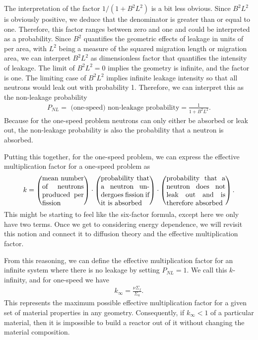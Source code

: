 The interpretation of the factor $1/(1 + B^2 L^2)$ is a bit less obvious. Since $B^2 L^2$ is obviously positive, we deduce that the denominator is greater than or equal to one. Therefore, this factor ranges between zero and one and could be interpreted as a probability. Since $B^2$ quantifies the geometric effects of leakage in units of per area, with $L^2$ being a measure of the squared migration length or migration area, we can interpret $B^2 L^2$ as dimensionless factor that quantifies the intensity of leakage. The limit of $B^2 L^2 = 0$ implies the geometry is infinite, and the factor is one. The limiting case of $B^2 L^2$ implies infinite leakage intensity so that all neutrons would leak out with probability 1. Therefore, we can interpret this as the non-leakage probability
\begin{align}
  P_{NL} = \text{ (one-speed) non-leakage probability} =  \frac{1}{ 1 + B^2 L^2 } .
\end{align}
Because for the one-speed problem neutrons can only either be absorbed or leak out, the non-leakage probability is also the probability that a neutron is absorbed.

Putting this together, for the one-speed problem, we can express the effective multiplication factor for a one-speed problem as
\begin{align}
   k = 		\left( \parbox{6em}{mean number of neutrons produced per fission} \right)
   \cdot	\left( \parbox{7em}{probability that a neutron undergoes fission if it is absorbed} \right)
   \cdot	\left( \parbox{8.5em}{probability that a neutron does not leak out and is therefore absorbed} \right) . \nonumber
\end{align}
This might be starting to feel like the six-factor formula, except here we only have two terms. Once we get to considering energy dependence, we will revisit this notion and connect it to diffusion theory and the effective multiplication factor.

From this reasoning, we can define the effective multiplication factor for an infinite system where there is no leakage by setting $P_{NL} = 1$. We call this $k$-infinity, and for one-speed we have
\begin{align}
  k_\infty = \frac{ \nu \Sigma_f }{ \Sigma_a } .
\end{align}
This represents the maximum possible effective multiplication factor for a given set of material properties in any geometry. Consequently, if $k_\infty < 1$ of a particular material, then it is impossible to build a reactor out of it without changing the material composition.

